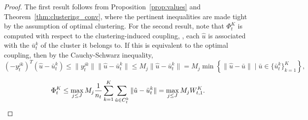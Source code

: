 \begin{proof}
 The first result follows from Proposition~\ref{prop:values} and Theorem~\ref{thm:clustering_conv}, where the pertinent inequalities are made tight by the assumption of optimal clustering.
For the second result, note that $\Phi^K_t$ is computed with respect to the clustering-induced coupling, \ie, each $\hat{u}$ is associated with the  $\bar{u}^k_t$ of the cluster it belongs to. If this is equivalent to the optimal coupling, then by the Cauchy-Schwarz inequality,
\begin{equation*}(-y^{jk}_t)^T (\hat{u} - \bar{u}^k_t) \leq \|y^{jk}_t\|\|\hat{u}- \bar{u}^k_t\|\leq M_j\|\hat{u} - \bar{u}^k_t\| =  M_j \min \left \{\|\hat{u} - \bar{u}\|\mid \bar{u} \in \{\bar{u}^k_t\}_{k=1}^K \right\} ,\end{equation*}

\begin{equation*}
    \begin{aligned}
\Phi^K_t \leq \max_{j\leq J} M_j\frac{1}{n_t}\sum_{k=1}^{K}\sum_{\hat{u} \in C^k_t}\|\hat{u} - \bar{u}^k_t\|  = \max_{j\leq J}M_jW^K_{t,1}.
    \end{aligned}
\end{equation*}
\end{proof}

